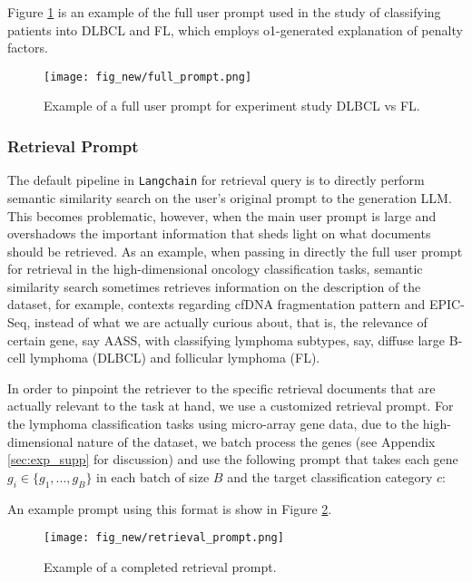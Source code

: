 Figure \ref{fig:full_prompt} is an example of the full user prompt used in the study of classifying patients into DLBCL and FL, which employs o1-generated explanation of penalty factors. 

\begin{figure}[h]
    \centering    \texttt{[image: fig\_new/full\_prompt.png]}
    \caption{Example of a full user prompt for experiment study DLBCL vs FL.}
    \label{fig:full_prompt}
\end{figure}

\subsubsection{Retrieval Prompt}
The default pipeline in \texttt{Langchain} for retrieval query is to directly perform semantic similarity search on the user's original prompt to the generation LLM. This becomes problematic, however, when the main user prompt is large and overshadows the important information that sheds light on what documents should be retrieved. As an example, when passing in directly the full user prompt for retrieval in the high-dimensional oncology classification tasks, semantic similarity search sometimes retrieves information on the description of the dataset, for example, contexts regarding cfDNA fragmentation pattern and EPIC-Seq, instead of what we are actually curious about, that is, the relevance of certain gene, say AASS, with classifying lymphoma subtypes, say, diffuse large B-cell lymphoma (DLBCL) and follicular lymphoma (FL). 

In order to pinpoint the retriever to the specific retrieval documents that are actually relevant to the task at hand, we use a customized retrieval prompt. For the lymphoma classification tasks using micro-array gene data, due to the high-dimensional nature of the dataset, we batch process the genes (see Appendix \ref{sec:exp_supp} for discussion) and use the following prompt that takes each gene $g_i \in \{g_1,...,g_B\}$ in each batch of size $B$ and the target classification category $c$:

\noindent{}
\vspace{1cm}

An example prompt using this format is show in Figure \ref{fig:retrieval_prompt}.

\begin{figure}[h]
    \centering    \texttt{[image: fig\_new/retrieval\_prompt.png]}
    \caption{Example of a completed retrieval prompt.}
    \label{fig:retrieval_prompt}
\end{figure}


